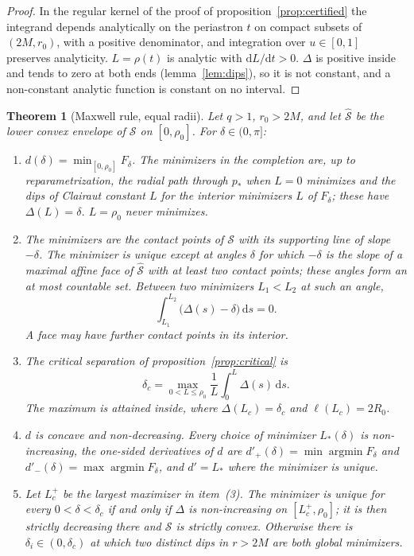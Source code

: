 \documentclass[aip,jmp,amsmath,amssymb,reprint]{revtex4-2}
\newcommand{\dd}{\mathrm{d}}
\theoremstyle{plain}
\newtheorem{theorem}{Theorem}
\theoremstyle{definition}
\begin{document}
\begin{proof}
In the regular kernel of the proof of proposition~\ref{prop:certified} the integrand depends
analytically on the periastron $t$ on compact subsets of $(2M,r_0)$, with a positive
denominator, and integration over $u\in[0,1]$ preserves analyticity. $L=\rho(t)$ is analytic
with $\dd L/\dd t>0$. $\Delta$ is positive inside and tends to zero at both ends
(lemma~\ref{lem:dips}), so it is not constant, and a non-constant analytic function is
constant on no interval.
\end{proof}

\begin{theorem}[Maxwell rule, equal radii]\label{thm:maxwell}
Let $q>1$, $r_0>2M$, and let $\hat{\mathcal S}$ be the lower convex envelope of $\mathcal S$ on
$[0,\rho_0]$. For $\delta\in(0,\pi]$:
\begin{enumerate}
\item $d(\delta)=\min_{[0,\rho_0]}F_\delta$. The minimizers in the completion are, up to
  reparametrization, the radial path through $p_*$ when $L=0$ minimizes and the dips of
  Clairaut constant $L$ for the interior minimizers $L$ of $F_\delta$; these have $\Delta(L)=\delta$.
  $L=\rho_0$ never minimizes.
\item The minimizers are the contact points of $\mathcal S$ with its supporting line of
  slope $-\delta$. The minimizer is unique except at angles $\delta$ for which $-\delta$ is the
  slope of a maximal affine face of $\hat{\mathcal S}$ with at least two contact points; these
  angles form an at most countable set. Between two minimizers $L_1<L_2$ at such an angle,
  \[
    \int_{L_1}^{L_2}\bigl(\Delta(s)-\delta\bigr)\,\dd s=0 .
  \]
  A face may have further contact points in its interior.
\item The critical separation of proposition~\ref{prop:critical} is
  \[
    \delta_c=\max_{0<L\le\rho_0}\frac1L\int_0^L\Delta(s)\,\dd s .
  \]
  The maximum is attained inside, where $\Delta(L_c)=\delta_c$ and $\ell(L_c)=2R_0$.
\item $d$ is concave and non-decreasing. Every choice of minimizer $L_*(\delta)$ is
  non-increasing, the one-sided derivatives of $d$ are $d'_+(\delta)=\min\operatorname{argmin}F_\delta$
  and $d'_-(\delta)=\max\operatorname{argmin}F_\delta$, and $d'=L_*$ where the minimizer is unique.
\item Let $L_c^+$ be the largest maximizer in item~(3). The minimizer is unique for every
  $0<\delta<\delta_c$ if and only if $\Delta$ is non-increasing on $[L_c^+,\rho_0]$; it is then
  strictly decreasing there and $\mathcal S$ is strictly convex. Otherwise there is
  $\delta_i\in(0,\delta_c)$ at which two distinct dips in $r>2M$ are both global minimizers.
\end{enumerate}
\end{theorem}
\end{document}
